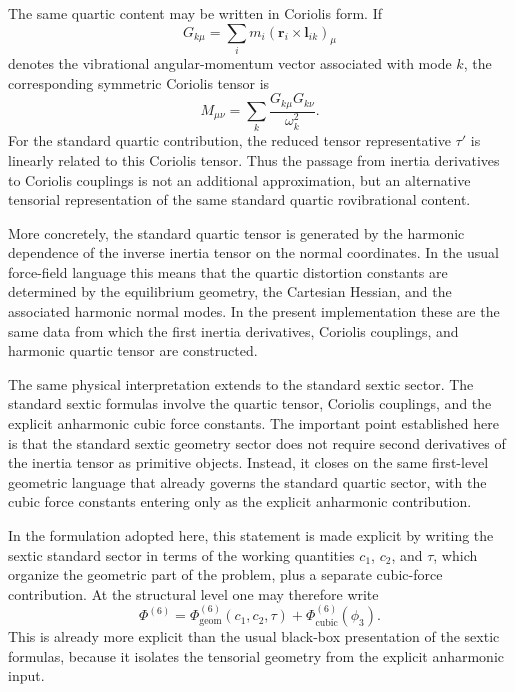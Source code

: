 \documentclass[journal=jacsat,manuscript=article]{achemso}
\begin{document}
The same quartic content may be written in Coriolis form. If
\begin{equation}
G_{k\mu}=\sum_i m_i\left(\mathbf r_i\times \mathbf l_{ik}\right)_\mu
\end{equation}
denotes the vibrational angular-momentum vector associated with mode
$k$, the corresponding symmetric Coriolis tensor is
\begin{equation}
M_{\mu\nu}=\sum_k\frac{G_{k\mu}G_{k\nu}}{\omega_k^2}.
\end{equation}
For the standard quartic contribution, the reduced tensor
representative $\tau'$ is linearly related to this Coriolis tensor.
Thus the passage from inertia derivatives to Coriolis couplings is not
an additional approximation, but an alternative tensorial
representation of the same standard quartic rovibrational content.

More concretely, the standard quartic tensor is generated by the
harmonic dependence of the inverse inertia tensor on the normal
coordinates. In the usual force-field language this means that the
quartic distortion constants are determined by the equilibrium
geometry, the Cartesian Hessian, and the associated harmonic normal
modes. In the present implementation these are the same data from
which the first inertia derivatives, Coriolis couplings, and harmonic
quartic tensor are constructed.

The same physical interpretation extends to the standard sextic
sector. The standard sextic formulas involve the quartic tensor,
Coriolis couplings, and the explicit anharmonic cubic force
constants. The important point established here is that the standard
sextic geometry sector does not require second derivatives of the
inertia tensor as primitive objects. Instead, it closes on the same
first-level geometric language that already governs the standard
quartic sector, with the cubic force constants entering only as the
explicit anharmonic contribution.

In the formulation adopted here, this statement is made explicit by
writing the sextic standard sector in terms of the working quantities
$c_1$, $c_2$, and $\tau$, which organize the geometric part of the
problem, plus a separate cubic-force contribution. At the structural
level one may therefore write
\begin{equation}
\Phi^{(6)} = \Phi^{(6)}_{\mathrm{geom}}(c_1,c_2,\tau)
+ \Phi^{(6)}_{\mathrm{cubic}}(\phi_3).
\end{equation}
This is already more explicit than the usual black-box presentation of
the sextic formulas, because it isolates the tensorial geometry from
the explicit anharmonic input.
\end{document}
